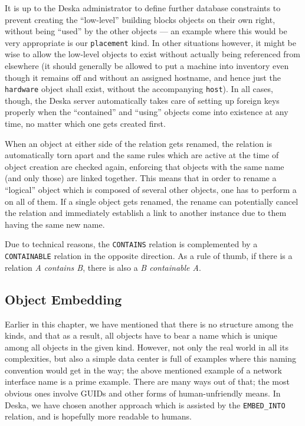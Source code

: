 \documentclass[deska]{subfiles}
\begin{document}
It is up to the Deska administrator to define further database constraints to prevent creating the ``low-level''
building blocks objects on their own right, without being ``used'' by the other objects --- an example where this would
be very appropriate is our {\tt placement} kind.  In other situations however, it might be wise to allow the low-level
objects to exist without actually being referenced from elsewhere (it should generally be allowed to put a machine into
inventory even though it remains off and without an assigned hostname, and hence just the {\tt hardware} object shall
exist, without the accompanying {\tt host}).  In all cases, though, the Deska server automatically takes care of setting
up foreign keys properly when the ``contained'' and ``using'' objects come into existence at any time, no matter which
one gets created first.

When an object at either side of the relation gets renamed, the relation is automatically torn apart and the same rules
which are active at the time of object creation are checked again, enforcing that objects with the same name (and only
those) are linked together.  This means that in order to rename a ``logical'' object which is composed of several other
objects, one has to perform a  on all of them.  If a single object gets renamed, the rename
can potentially cancel the relation and immediately establish a link to another instance due to them having the same new
name.

Due to technical reasons, the {\tt CONTAINS} relation is complemented by a {\tt CONTAINABLE} relation in the opposite
direction.  As a rule of thumb, if there is a relation {\em A contains B}, there is also a {\em B containable A}.

\subsection{Object Embedding}
\label{sec:relation-embed-into}

Earlier in this chapter, we have mentioned that there is no structure among the kinds, and that as a result, all objects
have to bear a name which is unique among all objects in the given kind.  However, not only the real world in all its
complexities, but also a simple data center is full of examples where this naming convention would get in the way; the
above mentioned example of a network interface name is a prime example.  There are many ways out of that; the most
obvious ones involve GUIDs and other forms of human-unfriendly means.  In Deska, we have chosen another approach which
is assisted by the {\tt EMBED\_INTO} relation, and is hopefully more readable to humans.
\end{document}
